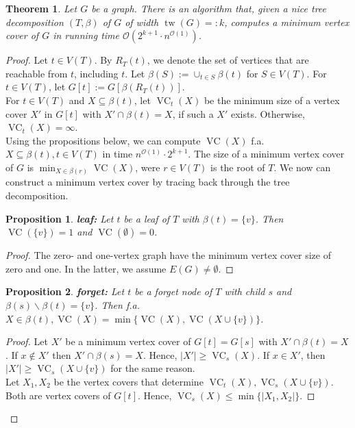 \documentclass[11pt,a4paper]{article}
\newtheorem*{theorem}{Theorem}
\newtheorem*{proposition}{Proposition}
\DeclareMathOperator{\tw}{tw}
\DeclareMathOperator{\VC}{VC}
\begin{document}
\begin{theorem}
Let $G$ be a graph. There is an algorithm that, given a nice tree decomposition $(T, \beta)$ of $G$ of width $\tw(G) =: k$, computes a minimum vertex cover of $G$ in running time $\mathcal{O}(2^{k+1} \cdot n^{\mathcal{O}(1)})$.
\end{theorem}

\begin{proof}
Let $t \in V(T)$. By $R_{T}(t)$, we denote the set of vertices that are reachable from $t$, including $t$. Let $\beta(S) := \cup_{t \in S} \beta(t)$ for $S \in V(T)$. For $t \in V(T)$, let $G[t] := G[\beta(R_{T}(t))]$. \\

For $t \in V(T)$ and $X \subseteq \beta(t)$, let $\VC_{t}(X)$ be the minimum size of a vertex cover $X'$ in $G[t]$ with $X' \cap \beta(t) = X$, if such a $X'$ exists. Otherwise, $\VC_{t}(X) = \infty$. \\

Using the propositions below, we can compute $\VC(X)$ f.a. $X \subseteq \beta(t), t \in V(T)$ in time $n^{\mathcal{O}(1)} \cdot 2^{k+1}$. The size of a minimum vertex cover of $G$ is $\min_{X \in \beta(r)} \VC(X)$, were $r \in V(T)$ is the root of $T$. We now can construct a minimum vertex cover by tracing back through the tree decomposition.

\begin{proposition}
\textbf{leaf:} Let $t$ be a leaf of $T$ with $\beta(t) = \{v\}$. Then $\VC(\{v\}) = 1$ and $\VC(\emptyset) = 0$.
\end{proposition}

\begin{proof}
The zero- and one-vertex graph have the minimum vertex cover size of zero and one. In the latter, we assume $E(G) \not = \emptyset$. 
\end{proof}

\begin{proposition}
\textbf{forget:} Let $t$ be a forget node of $T$ with child $s$ and $\beta(s) \backslash \beta(t) = \{v\}$. Then f.a. $X \in \beta(t), \VC(X) = \min \{\VC(X), \VC(X \cup \{v\})\}$.
\end{proposition}

\begin{proof}
Let $X'$ be a minimum vertex cover of $G[t] = G[s]$ with $X' \cap \beta(t) = X$. If $x \not \in X'$ then $X' \cap \beta(s) = X$. Hence, $|X'| \geq \VC_{s}(X)$. If $x \in X'$, then $|X'| \geq \VC_{s}(X \cup \{v\})$ for the same reason. \\
Let $X_{1}, X_{2}$ be the vertex covers that determine $\VC_{t}(X),  \VC_{s}(X \cup \{v\})$. Both are vertex covers of $G[t]$. Hence, $\VC_{s}(X) \leq \min \{|X_{1}, X_{2}| \}$.
\end{proof}



\end{proof}
\end{document}
